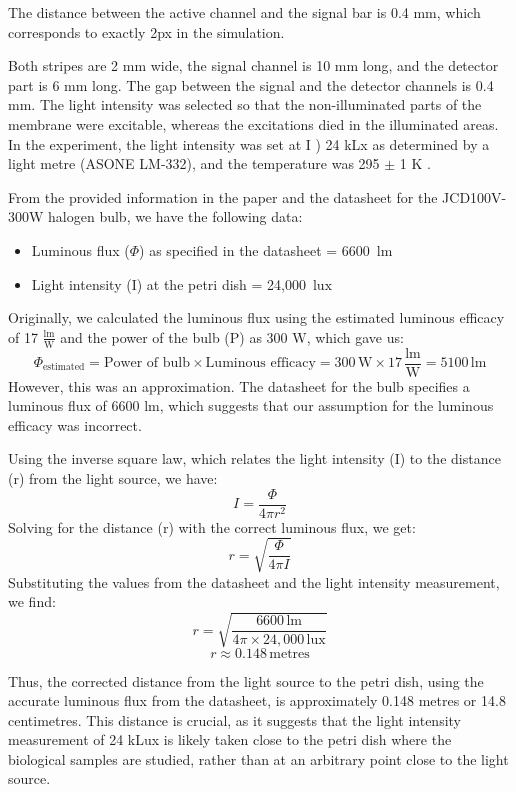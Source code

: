 The distance between the active channel and the signal bar is 0.4 mm, which corresponds to exactly 2px in the simulation. 

Both stripes are 2 mm wide, the signal channel is 10 mm long, and the detector part is 6 mm long. The gap between the signal and the detector channels is 0.4 mm. The light intensity was selected so that the non-illuminated parts of the membrane were excitable, whereas the excitations died in the illuminated areas. In the experiment, the light intensity was set at I ) 24 kLx as determined by a light metre (ASONE LM-332), and the temperature was 295 $\pm$ 1 K \citep{gorecki2003chemical}.


From the provided information in the paper and the datasheet for the JCD100V-300W halogen bulb, we have the following data:

\begin{itemize}
    \item Luminous flux ($\Phi$) as specified in the datasheet = 6600\, $\text{lm}$ \citep{fujilamp2024jdc}
    \item Light intensity (I) at the petri dish = 24,000\, $\text{lux}$
\end{itemize}

Originally, we calculated the luminous flux using the estimated luminous efficacy of 17 $\frac{\text{lm}}{\text{W}}$ and the power of the bulb (P) as 300 W, which gave us:
\[
\Phi_{\text{estimated}} = \text{Power of bulb} \times \text{Luminous efficacy} = 300\, \text{W} \times 17\, \frac{\text{lm}}{\text{W}} = 5100\, \text{lm}
\]
However, this was an approximation. The datasheet for the bulb specifies a luminous flux of 6600 lm, which suggests that our assumption for the luminous efficacy was incorrect.

Using the inverse square law, which relates the light intensity (I) to the distance (r) from the light source, we have:
\[
I = \frac{\Phi}{4\pi r^2}
\]
Solving for the distance (r) with the correct luminous flux, we get:
\[
r = \sqrt{\frac{\Phi}{4\pi I}}
\]
Substituting the values from the datasheet and the light intensity measurement, we find:
\[
r = \sqrt{\frac{6600\, \text{lm}}{4\pi \times 24,000\, \text{lux}}}
\]
\[
r \approx 0.148\, \text{metres}
\]

Thus, the corrected distance from the light source to the petri dish, using the accurate luminous flux from the datasheet, is approximately 0.148 metres or 14.8 centimetres. This distance is crucial, as it suggests that the light intensity measurement of 24 kLux is likely taken close to the petri dish where the biological samples are studied, rather than at an arbitrary point close to the light source.

